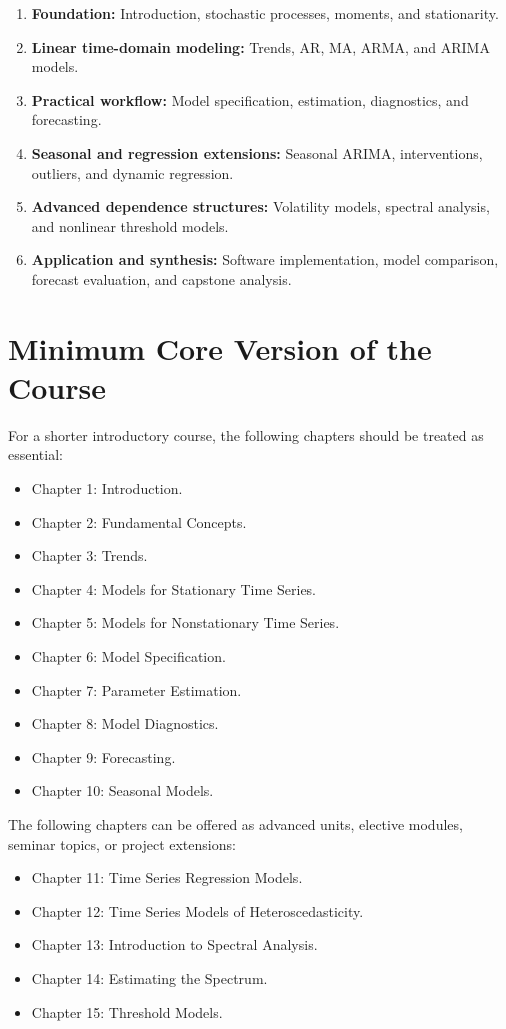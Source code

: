 \documentclass[11pt]{article}
\begin{document}
\begin{enumerate}
    \item \textbf{Foundation:} Introduction, stochastic processes, moments, and stationarity.
    \item \textbf{Linear time-domain modeling:} Trends, AR, MA, ARMA, and ARIMA models.
    \item \textbf{Practical workflow:} Model specification, estimation, diagnostics, and forecasting.
    \item \textbf{Seasonal and regression extensions:} Seasonal ARIMA, interventions, outliers, and dynamic regression.
    \item \textbf{Advanced dependence structures:} Volatility models, spectral analysis, and nonlinear threshold models.
    \item \textbf{Application and synthesis:} Software implementation, model comparison, forecast evaluation, and capstone analysis.
\end{enumerate}

\section{Minimum Core Version of the Course}

For a shorter introductory course, the following chapters should be treated as essential:

\begin{itemize}
    \item Chapter 1: Introduction.
    \item Chapter 2: Fundamental Concepts.
    \item Chapter 3: Trends.
    \item Chapter 4: Models for Stationary Time Series.
    \item Chapter 5: Models for Nonstationary Time Series.
    \item Chapter 6: Model Specification.
    \item Chapter 7: Parameter Estimation.
    \item Chapter 8: Model Diagnostics.
    \item Chapter 9: Forecasting.
    \item Chapter 10: Seasonal Models.
\end{itemize}

The following chapters can be offered as advanced units, elective modules, seminar topics, or project extensions:

\begin{itemize}
    \item Chapter 11: Time Series Regression Models.
    \item Chapter 12: Time Series Models of Heteroscedasticity.
    \item Chapter 13: Introduction to Spectral Analysis.
    \item Chapter 14: Estimating the Spectrum.
    \item Chapter 15: Threshold Models.
\end{itemize}
\end{document}
